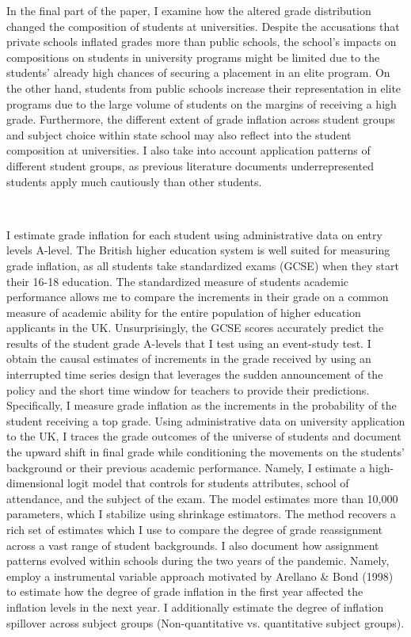 In the final part of the paper, I examine how the altered grade distribution changed the composition of students at universities. Despite the accusations that private schools inflated grades more than public schools, the school's impacts on compositions on students in university programs might be limited due to the students' already high chances of securing a placement in an elite program. On the other hand, students from public schools increase their representation in elite programs due to the large volume of students on the margins of receiving a high grade. Furthermore, the different extent of grade inflation across student groups and subject choice within state school may also reflect into the student composition at universities. I also take into account application patterns of different student groups, as previous literature documents underrepresented students apply much cautiously than other students.

\

I estimate grade inflation for each student using administrative data on entry levels A-level. The British higher education system is well suited for measuring grade inflation, as all students take standardized exams (GCSE) when they start their 16-18 education. The standardized measure of students academic performance allows me to compare the increments in their grade on a common measure of academic ability for the entire population of higher education applicants in the UK. Unsurprisingly, the GCSE scores accurately predict the results of the student grade A-levels that I test using an event-study test. I obtain the causal estimates of increments in the grade received by using an interrupted time series design that leverages the sudden announcement of the policy and the short time window for teachers to provide their predictions. Specifically, I measure grade inflation as the increments in the probability of the student receiving a top grade. Using administrative data on university application to the UK, I traces the grade outcomes of the universe of students and document the upward shift in final grade while conditioning the movements on the students' background or their previous academic performance. Namely, I estimate a high-dimensional logit model that controls for students attributes, school of attendance, and the subject of the exam. The model estimates more than 10,000 parameters, which I stabilize using shrinkage estimators. The method recovers a rich set of estimates which I use to compare the degree of grade reassignment across a vast range of student backgrounds. I also document how assignment patterns evolved within schools during the two years of the pandemic. Namely, employ a instrumental variable approach motivated by Arellano \& Bond (1998) to estimate how the degree of grade inflation in the first year affected the inflation levels in the next year. I additionally estimate the degree of inflation spillover across subject groups (Non-quantitative vs. quantitative subject groups). 

